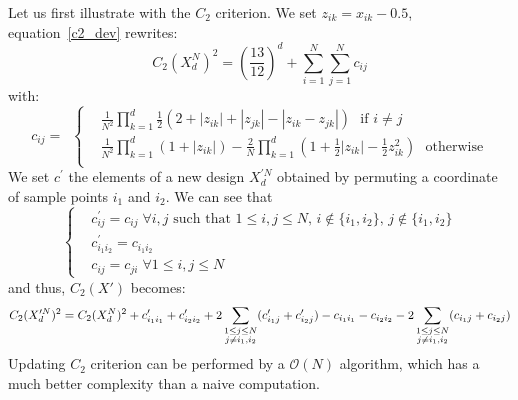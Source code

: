 {Let us first illustrate with the $C_2$ criterion. We set $z_{ik}=x_{ik}-0.5$, equation~\eqref{c2_dev} rewrites:
\begin{equation*}
C_2(X_{d}^N)^2 = \left(\frac{13}{12}\right)^{d} +\sum_{i=1}^{N}\sum_{j=1}^{N} c_{ij}
\end{equation*}
with:
\begin{equation}
c_{ij}= \,\,\,\left \{
\begin{aligned}
&\frac{1}{N^2}\prod_{k=1}^{d}\frac{1}{2}(2+|z_{ik}|+|z_{jk}|-|z_{ik}-z_{jk}|)\,\,\,\, \textrm{if}\,\, i\neq j \\
&\frac{1}{N^2}\prod_{k=1}^{d}(1+|z_{ik}|)-\frac{2}{N}\prod_{k=1}^{d}(1+\frac{1}{2}|z_{ik}|-\frac{1}{2}z_{ik}^2) \,\,\,\,\textrm{otherwise} \\
\end{aligned}
\right.
\label{prior_GN}
\end{equation}
We set $c^{\prime}$ the elements of a new design $X^{\prime N}_{d}$ obtained by permuting a coordinate of sample points $i_1$ and $i_2$.
We can see that
\begin{equation}
\left \{
\begin{aligned}
& c^{\prime}_{ij}=c_{ij} \;\forall i, j \text{ such that } 1\leq i,j\leq N,\, i\notin \{i_1,i_2\},\, j\notin \{i_1,i_2\}\\
& c^{\prime}_{i_1i_2}=c_{i_1i_2}\\
& c_{ij}=c_{ji} \;\forall 1\leq i,j\leq N
\end{aligned}
\right.
\label{cond_update}
\end{equation}
and thus, $C_2(X')$ becomes:
\begin{equation*}
C_2(X^{\prime N}_{d})^2 = C_2(X^N_d)^2
     + c^{\prime}_{i_1i_1} + c^{\prime}_{i_2i_2} + 2\sum_{\substack{1\leq j\leq N\\j\neq i_1,i_2}} (c^{\prime}_{i_1j}+c^{\prime}_{i_2j})\\
  {} - c_{i_1i_1} - c_{i_2i_2} - 2\sum_{\substack{1\leq j\leq N\\j\neq i_1,i_2}} (c_{i_1j}+c_{i_2j})
\end{equation*}
Updating $C_2$ criterion can be performed by a $\mathcal{O}(N)$ algorithm, which has a much better complexity than a naive computation.\\

}
